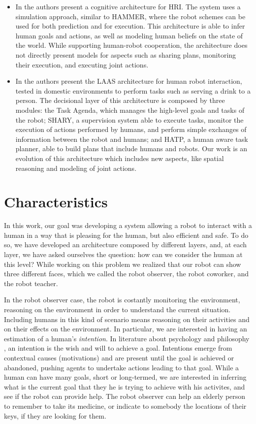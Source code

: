 \begin{itemize}
\item In \cite{BreazealGB09} the authors present a cognitive architecture for HRI. The system uses a simulation approach, similar to HAMMER, where the robot schemes can be used for both prediction and for execution. This architecture is able to infer human goals and actions, as well as modeling human beliefs on the state of the world. While supporting human-robot cooperation, the architecture does not directly present models for aspects such as sharing plans, monitoring their execution, and executing joint actions. 

\item In \cite{clodic2009shary} the authors present the LAAS architecture
 for human robot interaction, tested in domestic environments to
perform tasks such as serving a drink to a person. The decisional layer of this architecture
is composed by three modules: the Task Agenda, which manages the high-level goals and tasks of the 
robot; SHARY, a supervision system able to execute tasks, monitor the execution of actions performed by humans, and perform simple exchanges of information between the robot and humans; and HATP, a human aware task planner, able to build plans that include humans and robots. Our work is an
evolution of this architecture which includes new aspects, like spatial
reasoning and modeling of joint actions.

\end{itemize}

\section{Characteristics}

In this work, our goal was developing a system allowing a robot to interact with a human in a way that is pleasing for the human, but also efficient and safe. To do so, we have developed an architecture composed by different layers, and, at each layer, we have asked ourselves the question: how can we consider the human at this level? While working on this problem we realized that our robot can show three different faces, which we called the robot observer, the robot coworker, and the robot teacher.

In the robot observer case, the robot is costantly monitoring the environment, reasoning on the environment in order to understand the current situation.  Including humans in this kind of scenario means reasoning on their activities and on their effects on the environment. In particular, we are interested in having an estimation of a human's \textit{intention}. In literature about psychology \cite{bruner1981} and philosophy \cite{bratman1984}, an intention is the wish and will to achieve a goal. Intentions emerge from contextual causes (motivations) and are present until the goal is achieved or abandoned, pushing agents to undertake actions leading to that goal. While a human can have many goals, short or long-termed, we are interested in inferring what is the current goal that they he is trying to achieve with his activites, and see if the robot can provide help. The robot observer can help an elderly person to remember to take its medicine, or indicate to somebody the locations of their keys, if they are looking for them.

